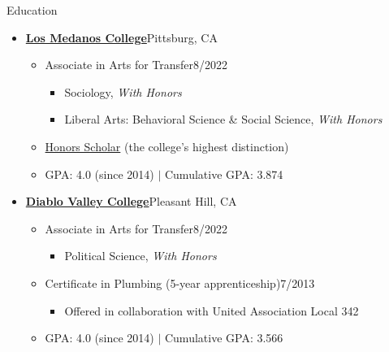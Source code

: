 \documentclass[12pt]{resume} %
\begin{document}
\begin{rSection}{Education}
\begin{itemize}[leftmargin=0em, itemsep=0pt]
\begin{itemize}[leftmargin=1em, itemsep=0pt]
\end{itemize}
\vspace{12pt}
\item[] \textbf{\href{https://www.losmedanos.edu/}{Los Medanos College}}\hfill{}Pittsburg, CA
\begin{itemize}[leftmargin=1em, itemsep=0pt]
    \item[] Associate in Arts for Transfer\hfill{}8/2022
    \begin{itemize}[leftmargin=1em, itemsep=0pt]
        \item[] Sociology, \textit{With Honors}
        \item[] Liberal Arts: Behavioral Science \& Social Science, \textit{With Honors}
    \end{itemize}
    \item[] \href{https://www.losmedanos.edu/honors/prog.aspx}{Honors Scholar} (the college’s highest distinction)
   \item[] GPA: 4.0 (since 2014) $|$ Cumulative GPA: 3.874
\end{itemize}
\vspace{12pt}
\item[] \textbf{\href{https://www.dvc.edu/}{Diablo Valley College}}\hfill{}Pleasant Hill, CA
\begin{itemize}[leftmargin=1em, itemsep=0pt]
    \item[] Associate in Arts for Transfer\hfill{}8/2022
    \begin{itemize}[leftmargin=1em, itemsep=0pt]
        \item[] Political Science, \textit{With Honors}
    \end{itemize}
    \item[] Certificate in Plumbing (5-year apprenticeship)\hfill{}7/2013
    \begin{itemize}[leftmargin=1em, itemsep=0pt]
        \item[] Offered in collaboration with United Association Local 342
    \end{itemize}
    \item[] GPA: 4.0 (since 2014) $|$ Cumulative GPA: 3.566
\end{itemize}
\end{itemize}

\end{rSection}
\end{document}
